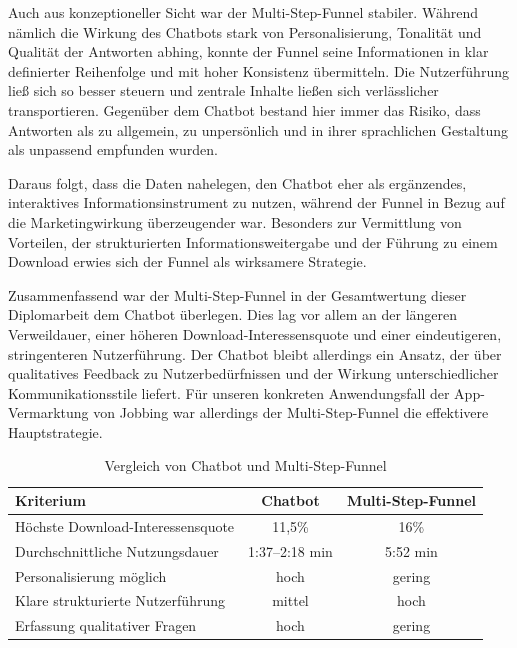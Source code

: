 Auch aus konzeptioneller Sicht war der Multi-Step-Funnel stabiler. Während 
nämlich die Wirkung des Chatbots stark von Personalisierung, Tonalität und 
Qualität der Antworten abhing, konnte der Funnel seine Informationen in klar 
definierter Reihenfolge und mit hoher Konsistenz übermitteln. Die Nutzerführung 
ließ sich so besser steuern und zentrale Inhalte ließen sich verlässlicher 
transportieren. Gegenüber dem Chatbot bestand hier immer das Risiko, dass 
Antworten als zu allgemein, zu unpersönlich und in ihrer sprachlichen 
Gestaltung als unpassend empfunden wurden.

Daraus folgt, dass die Daten nahelegen, den Chatbot eher als ergänzendes, 
interaktives Informationsinstrument zu nutzen, während der Funnel in Bezug auf 
die Marketingwirkung überzeugender war. Besonders zur Vermittlung von Vorteilen, 
der strukturierten Informationsweitergabe und der Führung zu einem Download 
erwies sich der Funnel als wirksamere Strategie.

Zusammenfassend war der Multi-Step-Funnel in der Gesamtwertung dieser 
Diplomarbeit dem Chatbot überlegen. Dies lag vor allem an der längeren 
Verweildauer, einer höheren Download-Interessensquote und einer eindeutigeren, 
stringenteren Nutzerführung. Der Chatbot bleibt allerdings ein Ansatz, der 
über qualitatives Feedback zu Nutzerbedürfnissen und der Wirkung 
unterschiedlicher Kommunikationsstile liefert. Für unseren konkreten 
Anwendungsfall der App-Vermarktung von Jobbing war allerdings der 
Multi-Step-Funnel die effektivere Hauptstrategie.

\begin{table}[h]
\centering
\begin{tabular}{|l|c|c|}
\hline
Kriterium & Chatbot & Multi-Step-Funnel \\
\hline
Höchste Download-Interessensquote & 11,5\% & 16\% \\
Durchschnittliche Nutzungsdauer & 1:37--2:18 min & 5:52 min \\
Personalisierung möglich & hoch & gering \\
Klare strukturierte Nutzerführung & mittel & hoch \\
Erfassung qualitativer Fragen & hoch & gering \\
\hline
\end{tabular}
\caption{Vergleich von Chatbot und Multi-Step-Funnel}
\end{table}
